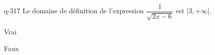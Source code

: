 \begin{truefalse}{q-317}
Le domaine de définition de l'expression $\dfrac{1}{\sqrt{2x-6}}$ est $]3,+\infty[$.
\item* Vrai
\item Faux
\end{truefalse}

